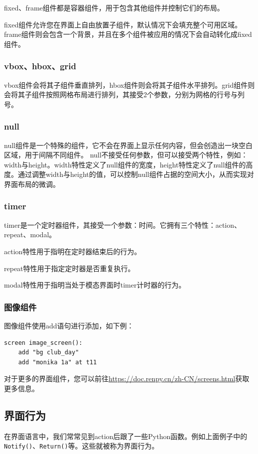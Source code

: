 \documentclass[../../Main.tex]{subfiles}
\begin{document}
fixed、frame组件都是容器组件，用于包含其他组件并控制它们的布局。

fixed组件允许您在界面上自由放置子组件，默认情况下会填充整个可用区域。frame组件则会包含一个背景，并且在多个组件被应用的情况下会自动转化成fixed组件。

\subsubsection{vbox、hbox、grid}
vbox组件会将其子组件垂直排列，hbox组件则会将其子组件水平排列。grid组件则会将其子组件按照网格布局进行排列，其接受2个参数，分别为网格的行号与列号。

\subsubsection{null}
null组件是一个特殊的组件，它不会在界面上显示任何内容，但会创造出一块空白区域，用于间隔不同组件。
null不接受任何参数，但可以接受两个特性，例如：width与height。width特性定义了null组件的宽度，height特性定义了null组件的高度。通过调整width与height的值，可以控制null组件占据的空间大小，从而实现对界面布局的微调。

\subsubsection{timer}
timer是一个定时器组件，其接受一个参数：时间。它拥有三个特性：action、repeat、modal。

action特性用于指明在定时器结束后的行为。

repeat特性用于指定定时器是否重复执行。

modal特性用于指明当处于模态界面时timer计时器的行为。

\subsubsection{图像组件}

图像组件使用add语句进行添加，如下例：
\begin{lstlisting}
screen image_screen():
    add "bg club_day"
    add "monika 1a" at t11
\end{lstlisting}

对于更多的界面组件，您可以前往\url{https://doc.renpy.cn/zh-CN/screens.html}获取更多信息。

\subsection{界面行为}
在界面语言中，我们常常见到action后跟了一些Python函数。例如上面例子中的\verb|Notify()|、\verb|Return()|等。这些就被称为界面行为。
\end{document}
